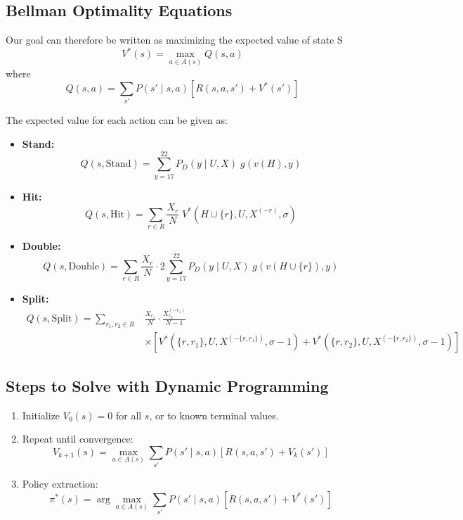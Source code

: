 \documentclass[12pt,a4paper]{cibb}
\begin{document}
\subsection*{Bellman Optimality Equations}

Our goal can therefore be written as maximizing the expected value of state S
\[
  V^*(s) = \max_{a \in A(s)} Q(s, a)
\]
where
\[
  Q(s,a) = \sum_{s'} P(s' \mid s, a) \left[ R(s,a,s') + V^*(s') \right]
\]

The expected value for each action can be given as:

\begin{itemize}
  \item \textbf{Stand:}
  \[
    Q(s, \mathrm{Stand}) = \sum_{y=17}^{22} P_D(y \mid U, X)\; g(v(H), y)
  \]

  \item \textbf{Hit:}
  \[
    Q(s, \mathrm{Hit}) = \sum_{r \in R} \frac{X_r}{N}\; V^*(H \cup \{r\}, U, X^{(-r)}, σ)
  \]

  \item \textbf{Double:}
  \[
    Q(s, \mathrm{Double}) = \sum_{r \in R} \frac{X_r}{N} \cdot 2 \sum_{y=17}^{22} P_D(y \mid U, X)\; g(v(H \cup \{r\}), y)
  \]
  \item \textbf{Split:}
  \begin{align*}
    Q(s, \mathrm{Split}) =
    \sum_{r_1, r_2 \in R} & \frac{X_{r_1}}{N} \cdot \frac{X^{(-r_1)}_{r_2}}{N - 1} \\
    & \times \left[
      V^*(\{r, r_1\}, U, X^{(-\{r, r_1\})}, σ-1)
      + V^*(\{r, r_2\}, U, X^{(-\{r, r_2\})}, σ-1)
    \right]
  \end{align*}
\end{itemize}

\subsection{Steps to Solve with Dynamic Programming}

\begin{enumerate}
  \item Initialize \( V_0(s) = 0 \) for all \( s \), or to known terminal values.
  \item Repeat until convergence:
  \[
    V_{k+1}(s) = \max_{a \in A(s)} \sum_{s'} P(s' \mid s, a) [ R(s,a,s') + V_k(s') ]
  \]
  \item Policy extraction:
  \[
    \pi^*(s) = \arg\max_{a \in A(s)} \sum_{s'} P(s' \mid s,a) [ R(s,a,s') + V^*(s') ]
  \]
\end{enumerate}
\end{document}
